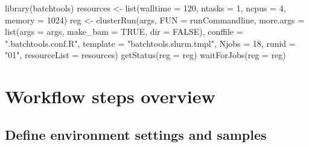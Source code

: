 \documentclass[14pt,]{article}
\newcommand{\hlnum}[1]{\textcolor[rgb]{0.816,0.125,0.439}{#1}}%
\newcommand{\hlstr}[1]{\textcolor[rgb]{0.251,0.627,0.251}{#1}}%
\newcommand{\hlstd}[1]{\textcolor[rgb]{0.251,0.251,0.251}{#1}}%
\newenvironment{Shaded}{\begin{myshaded}}{\end{myshaded}}
\newcommand{\DecValTok}[1]{\hlnum{#1}}
\newcommand{\ConstantTok}[1]{\hlnum{#1}}
\newcommand{\StringTok}[1]{\hlstr{#1}}
\newcommand{\OtherTok}[1]{{#1}}
\newcommand{\FunctionTok}[1]{\hlstd{#1}}
\newcommand{\AttributeTok}[1]{{#1}}
\newcommand{\NormalTok}[1]{\hlstd{#1}}
\begin{document}
\begin{Shaded}
\begin{Highlighting}[]
\FunctionTok{library}\NormalTok{(batchtools)}
\NormalTok{resources }\OtherTok{\textless{}{-}} \FunctionTok{list}\NormalTok{(}\AttributeTok{walltime =} \DecValTok{120}\NormalTok{, }\AttributeTok{ntasks =} \DecValTok{1}\NormalTok{, }\AttributeTok{ncpus =} \DecValTok{4}\NormalTok{, }\AttributeTok{memory =} \DecValTok{1024}\NormalTok{)}
\NormalTok{reg }\OtherTok{\textless{}{-}} \FunctionTok{clusterRun}\NormalTok{(args, }\AttributeTok{FUN =}\NormalTok{ runCommandline, }\AttributeTok{more.args =} \FunctionTok{list}\NormalTok{(}\AttributeTok{args =}\NormalTok{ args, }\AttributeTok{make\_bam =} \ConstantTok{TRUE}\NormalTok{, }
    \AttributeTok{dir =} \ConstantTok{FALSE}\NormalTok{), }\AttributeTok{conffile =} \StringTok{".batchtools.conf.R"}\NormalTok{, }\AttributeTok{template =} \StringTok{"batchtools.slurm.tmpl"}\NormalTok{, }
    \AttributeTok{Njobs =} \DecValTok{18}\NormalTok{, }\AttributeTok{runid =} \StringTok{"01"}\NormalTok{, }\AttributeTok{resourceList =}\NormalTok{ resources)}
\FunctionTok{getStatus}\NormalTok{(}\AttributeTok{reg =}\NormalTok{ reg)}
\FunctionTok{waitForJobs}\NormalTok{(}\AttributeTok{reg =}\NormalTok{ reg)}
\end{Highlighting}
\end{Shaded}

\hypertarget{workflow-steps-overview}{%
\section{Workflow steps overview}\label{workflow-steps-overview}}

\hypertarget{define-environment-settings-and-samples}{%
\subsection{Define environment settings and samples}\label{define-environment-settings-and-samples}}
\end{document}
